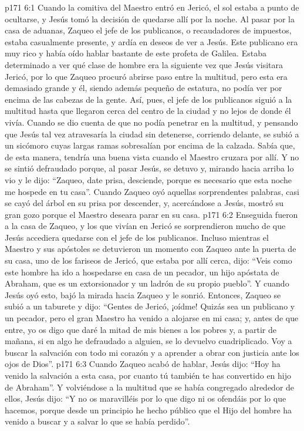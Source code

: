 \vs p171 6:1 Cuando la comitiva del Maestro entró en Jericó, el sol estaba a punto de ocultarse, y Jesús tomó la decisión de quedarse allí por la noche. Al pasar por la casa de aduanas, Zaqueo el jefe de los publicanos, o recaudadores de impuestos, estaba casualmente presente, y ardía en deseos de ver a Jesús. Este publicano era muy rico y había oído hablar bastante de este profeta de Galilea. Estaba determinado a ver qué clase de hombre era la siguiente vez que Jesús visitara Jericó, por lo que Zaqueo procuró abrirse paso entre la multitud, pero esta era demasiado grande y él, siendo además pequeño de estatura, no podía ver por encima de las cabezas de la gente. Así, pues, el jefe de los publicanos siguió a la multitud hasta que llegaron cerca del centro de la ciudad y no lejos de donde él vivía. Cuando se dio cuenta de que no podía penetrar en la multitud, y pensando que Jesús tal vez atravesaría la ciudad sin detenerse, corriendo delante, se subió a un sicómoro cuyas largas ramas sobresalían por encima de la calzada. Sabía que, de esta manera, tendría una buena vista cuando el Maestro cruzara por allí. Y no se sintió defraudado porque, al pasar Jesús, se detuvo y, mirando hacia arriba lo vio y le dijo: “Zaqueo, date prisa, desciende, porque es necesario que esta noche me hospede en tu casa”. Cuando Zaqueo oyó aquellas sorprendentes palabras, casi se cayó del árbol en su prisa por descender, y, acercándose a Jesús, mostró su gran gozo porque el Maestro deseara parar en su casa.
\vs p171 6:2 Enseguida fueron a la casa de Zaqueo, y los que vivían en Jericó se sorprendieron mucho de que Jesús accediera quedarse con el jefe de los publicanos. Incluso mientras el Maestro y sus apóstoles se detuvieron un momento con Zaqueo ante la puerta de su casa, uno de los fariseos de Jericó, que estaba por allí cerca, dijo: “Veis como este hombre ha ido a hospedarse en casa de un pecador, un hijo apóstata de Abraham, que es un extorsionador y un ladrón de su propio pueblo”. Y cuando Jesús oyó esto, bajó la mirada hacia Zaqueo y le sonrió. Entonces, Zaqueo se subió a un taburete y dijo: “Gentes de Jericó, ¡oídme! Quizás sea un publicano y un pecador, pero el gran Maestro ha venido a alojarse en mi casa; y, antes de que entre, yo os digo que daré la mitad de mis bienes a los pobres y, a partir de mañana, si en algo he defraudado a alguien, se lo devuelvo cuadriplicado. Voy a buscar la salvación con todo mi corazón y a aprender a obrar con justicia ante los ojos de Dios”.
\vs p171 6:3 Cuando Zaqueo acabó de hablar, Jesús dijo: “Hoy ha venido la salvación a esta casa, por cuanto tú también te has convertido en hijo de Abraham”. Y volviéndose a la multitud que se había congregado alrededor de ellos, Jesús dijo: “Y no os maravilléis por lo que digo ni os ofendáis por lo que hacemos, porque desde un principio he hecho público que el Hijo del hombre ha venido a buscar y a salvar lo que se había perdido”.
